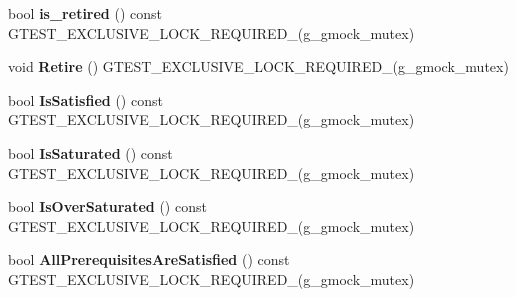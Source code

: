 \begin{DoxyCompactItemize}
\item 
\mbox{\label{classtesting_1_1internal_1_1_expectation_base_afe539dbc5b29d9635403767a4708c476}} 
bool {\bfseries is\+\_\+retired} () const G\+T\+E\+S\+T\+\_\+\+E\+X\+C\+L\+U\+S\+I\+V\+E\+\_\+\+L\+O\+C\+K\+\_\+\+R\+E\+Q\+U\+I\+R\+E\+D\+\_\+(g\+\_\+gmock\+\_\+mutex)
\item 
\mbox{\label{classtesting_1_1internal_1_1_expectation_base_a0aeeb4c1e66c2f2aa0853c267ad3e781}} 
void {\bfseries Retire} () G\+T\+E\+S\+T\+\_\+\+E\+X\+C\+L\+U\+S\+I\+V\+E\+\_\+\+L\+O\+C\+K\+\_\+\+R\+E\+Q\+U\+I\+R\+E\+D\+\_\+(g\+\_\+gmock\+\_\+mutex)
\item 
\mbox{\label{classtesting_1_1internal_1_1_expectation_base_ae629adc2dd9aee0ac62e50314f1a6449}} 
bool {\bfseries Is\+Satisfied} () const G\+T\+E\+S\+T\+\_\+\+E\+X\+C\+L\+U\+S\+I\+V\+E\+\_\+\+L\+O\+C\+K\+\_\+\+R\+E\+Q\+U\+I\+R\+E\+D\+\_\+(g\+\_\+gmock\+\_\+mutex)
\item 
\mbox{\label{classtesting_1_1internal_1_1_expectation_base_ad3e4340cedefdc24fce1478a8d6cab93}} 
bool {\bfseries Is\+Saturated} () const G\+T\+E\+S\+T\+\_\+\+E\+X\+C\+L\+U\+S\+I\+V\+E\+\_\+\+L\+O\+C\+K\+\_\+\+R\+E\+Q\+U\+I\+R\+E\+D\+\_\+(g\+\_\+gmock\+\_\+mutex)
\item 
\mbox{\label{classtesting_1_1internal_1_1_expectation_base_a080dab35ecc6c57096f50758a0e8123d}} 
bool {\bfseries Is\+Over\+Saturated} () const G\+T\+E\+S\+T\+\_\+\+E\+X\+C\+L\+U\+S\+I\+V\+E\+\_\+\+L\+O\+C\+K\+\_\+\+R\+E\+Q\+U\+I\+R\+E\+D\+\_\+(g\+\_\+gmock\+\_\+mutex)
\item 
\mbox{\label{classtesting_1_1internal_1_1_expectation_base_a82ba68cdd71a8b5aff5a5be24c23a637}} 
bool {\bfseries All\+Prerequisites\+Are\+Satisfied} () const G\+T\+E\+S\+T\+\_\+\+E\+X\+C\+L\+U\+S\+I\+V\+E\+\_\+\+L\+O\+C\+K\+\_\+\+R\+E\+Q\+U\+I\+R\+E\+D\+\_\+(g\+\_\+gmock\+\_\+mutex)
\item 
\mbox{\label{classtesting_1_1internal_1_1_expectation_base_a9eb518c079f950a59c67e8012d3371c0}} 

\end{DoxyCompactItemize}
